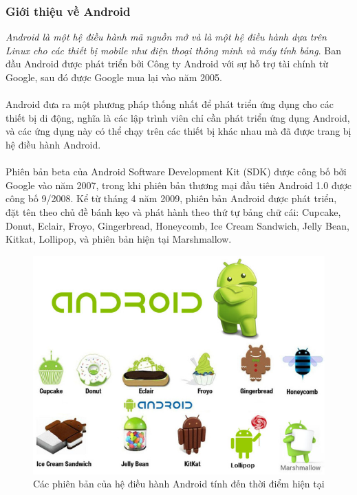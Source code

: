 \documentclass[a4paper]{article}
\begin{document}
\subsubsection{Giới thiệu về Android}
\textit{Android là một hệ điều hành mã nguồn mở và là một hệ điều hành dựa trên Linux cho các thiết bị mobile như điện thoại thông minh và máy tính bảng}. Ban đầu Android được phát triển bởi Công ty Android với sự hỗ trợ tài chính từ Google, sau đó được Google mua lại vào năm 2005.\\
\\
Android đưa ra một phương pháp thống nhất để phát triển ứng dụng cho các thiết bị di động, nghĩa là các lập trình viên chỉ cần phát triển ứng dụng Android, và các ứng dụng này có thể chạy trên các thiết bị khác nhau mà đã được trang bị hệ điều hành Android.\\
\\
Phiên bản beta của Android Software Development Kit (SDK) được công bố bởi Google vào năm 2007, trong khi phiên bản thương mại đầu tiên Android 1.0 được công bố 9/2008.  Kể từ tháng 4 năm 2009, phiên bản Android được phát triển, đặt tên theo chủ đề bánh kẹo và phát hành theo thứ tự bảng chữ cái: Cupcake, Donut, Eclair, Froyo, Gingerbread, Honeycomb, Ice Cream Sandwich, Jelly Bean, Kitkat, Lollipop, và phiên bản hiện tại Marshmallow.
\begin{center}
    \begin{figure}[h]
    \begin{center}
     \includegraphics[scale=.4]{android_version.jpg}
    \end{center}
    \caption{Các phiên bản của hệ điều hành Android tính đến thời điểm hiện tại}
    \label{refhinh1}
    \end{figure}
\end{center}
\end{document}
